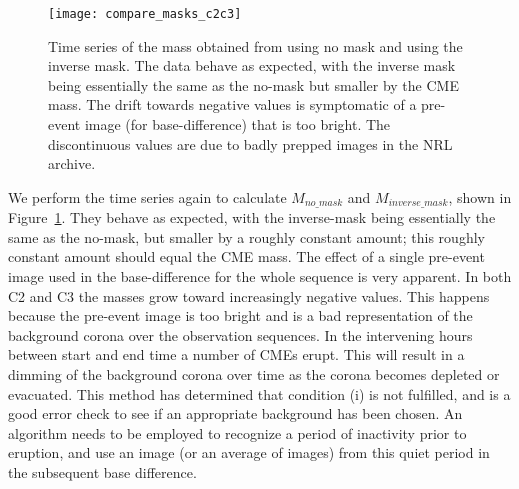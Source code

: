 \begin{figure}[t!]
\begin{center}
\texttt{[image: compare\_masks\_c2c3]}
\caption[Inverse mass time series]{Time series of the mass obtained from using no mask and using the inverse mask. The data behave as expected, with the inverse mask being essentially the same as the no-mask but smaller by the CME mass. The drift towards negative values is symptomatic of a pre-event image (for base-difference) that is too bright. The discontinuous values are due to badly prepped images in the NRL archive.}
\label{fig:comparison0}
\end{center}
\end{figure}
We perform the time series again to calculate $M_{no\_mask}$ and $M_{inverse\_mask}$, shown in Figure~\ref{fig:comparison0}. They behave as expected, with the inverse-mask being essentially the same as the no-mask, but smaller by a roughly constant amount; this roughly constant amount should equal the CME mass. The effect of a single pre-event image used in the base-difference for the whole sequence is very apparent. In both C2 and C3 the masses grow toward increasingly negative values. This happens because the pre-event image is too bright and is a bad representation of the background corona over the observation sequences. In the intervening hours between start and end time a number of CMEs erupt. This will result in a dimming of the background corona over time as the corona becomes depleted or evacuated. This method has determined that condition (i) is not fulfilled, and is a good error check to see if an appropriate background has been chosen. An algorithm needs to be employed to recognize a period of inactivity prior to eruption, and use an image (or an average of images) from this quiet period in the subsequent base difference.

